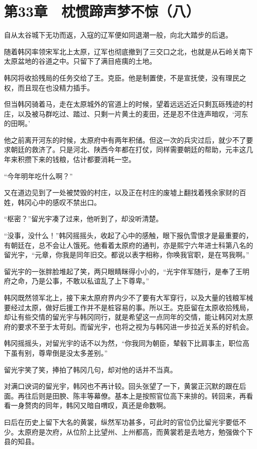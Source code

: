 \section{第33章　枕惯蹄声梦不惊（八）}

自从太谷城下无功而返，入寇的辽军便如同退潮一般，向北大踏步的后退。

随着韩冈率领宋军北上太原，辽军也彻底撤到了三交口之北，也就是从石岭关南下太原盆地的谷道之中。只留下了满目疮痍的土地。

韩冈将收拾残局的任务交给了王。克臣。他是制置使，不是宣抚使，没有理民之权，而且现在也没精力插手。

但当韩冈骑着马，走在太原城外的官道上的时候，望着远远近近只剩瓦砾残迹的村庄，以及被马群吃过、踏过、只剩一片黄土的麦田，还是忍不住连声暗叹，‘河东的田啊。’

他之前离开河东的时候，太原府中有两年积储。但这一次的兵灾过后，就少不了要求朝廷的救济了。只是河北、陕西今年都在打仗，同样需要朝廷的帮助，元丰这几年来积攒下来的钱粮，估计都要消耗一空。

“今年明年吃什么啊？”

又在道边见到了一处被焚毁的村庄，以及正在村庄的废墟上翻找着残余家财的百姓，韩冈心中的感叹不禁出口。

“枢密？”留光宇凑了过来，他听到了，却没听清楚。

“没事，没什么！”韩冈摇摇头，收起了心中的感触，眼下报仇雪恨才是最重要的，有朝廷在，总不会让人饿死。他看着太原府的通判，亦是熙宁六年进士科第八名的留光宇，“元章，你我是同年旧交。都说以表字相称，你唤我官职，是在骂我啊。”

留光宇的一张胖脸堆起了笑，两只眼睛眯得小小的，“光宇伴军随行，是奉了王明府之命，乃是公事，不敢以私谊乱了上下尊卑。”

韩冈既然领军北上，接下来太原府界内少不了要有大军穿行，以及大量的钱粮军械要经过太原，做好后援工作并不是桩容易的事。所以王。克臣留在太原收拾残局，却让有些交情的留光宇与韩冈同行，就是希望这一点同年的交情，能让韩冈对太原府的要求不至于太苛刻。而留光宇，也将之视为与韩冈进一步拉近关系的好机会。

韩冈摇摇头，对留光宇的话不以为然，“你我同为朝臣，辇毂下比肩事主，职位高下虽有别，尊卑倒是没太多差别。”

留光宇笑了笑，捧拍了韩冈几句，却对他的话并不当真。

对满口谀词的留光宇，韩冈也不再计较。回头张望了一下，黄裳正沉默的跟在后面。再往后则是田腴、陈丰等幕僚。基本上是按照官位高下来排的。转回来，再看看一身赘肉的同年，韩冈又暗自喟叹，真还是命数啊。

曰后在历史上留下大名的黄裳，纵然军功甚多，可此时的官位仍比留光宇要低不少。太原府是次府，从位阶上比望州、上州都高，而黄裳若是去地方，勉强做个下县的知县。

